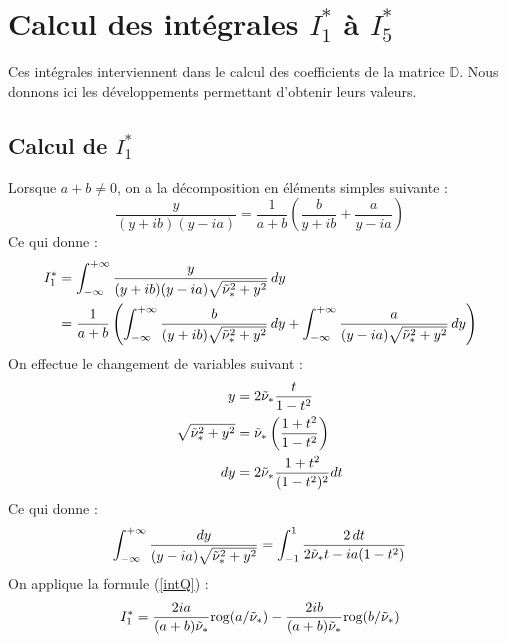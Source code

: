 \chapter{Calcul des intégrales $I_1^*$ à $I_5^*$}
\label{matD}
Ces intégrales interviennent dans le calcul des coefficients de la matrice $\mathbb{D}$. Nous donnons ici les développements permettant d'obtenir leurs valeurs.
\section{Calcul de $I_1^*$}
\label{calcI1}
Lorsque $a+b \neq 0$, on a la décomposition en éléments simples suivante :
\begin{equation}
\frac{y}{(y+ib)(y-ia)}=\frac{1}{a+b} \left( \frac{b}{y+ib}+\frac{a}{y-ia} \right) 
\label{decomp2}
\end{equation}
Ce qui donne : 
\begin{equation*}
\begin{split}
I_1^*&=\int_{-\infty}^{+\infty} \frac{y}{(y+ib)(y-ia)\sqrt{\tilde{\nu}_*^2+y^2}}\,dy\\
&= \frac{1}{a+b} \left( \int_{-\infty}^{+\infty} \frac{b}{(y+ib)\sqrt{\tilde{\nu}_*^2+y^2}} \,dy +\int_{-\infty}^{+\infty} \frac{a}{(y-ia)\sqrt{\tilde{\nu}_*^2+y^2}} \,dy \right)
\end{split}
\end{equation*}
On effectue le changement de variables suivant :
\begin{equation}
\begin{split}
 y&=2\tilde{\nu}_* \frac{t}{1-t^2} \\
\sqrt{\tilde{\nu}_*^2+y^2}&=\tilde{\nu}_*\left( \frac{1+t^2}{1-t^2} \right)  \\
 dy&= 2\tilde{\nu}_* \frac{1+t^2}{(1-t^2)^2}dt 
\end{split}
\label{changevar}
\end{equation}
Ce qui donne :
\begin{equation*}
\int_{-\infty}^{+\infty} \frac{dy}{(y-ia)\sqrt{\tilde{\nu}_*^2+y^2}}=\int_{-1}^1\frac{2\,dt}{2\tilde{\nu}_*t-ia(1-t^2)}
\end{equation*}
On applique la formule (\ref{intQ}) :
\begin{equation*}
I_1^*=\frac{2ia}{(a+b)\tilde{\nu}_*}\mbox{rog}(a/\tilde{\nu}_*)-\frac{2ib}{(a+b)\tilde{\nu}_*}\mbox{rog}(b/\tilde{\nu}_*)
\end{equation*}

